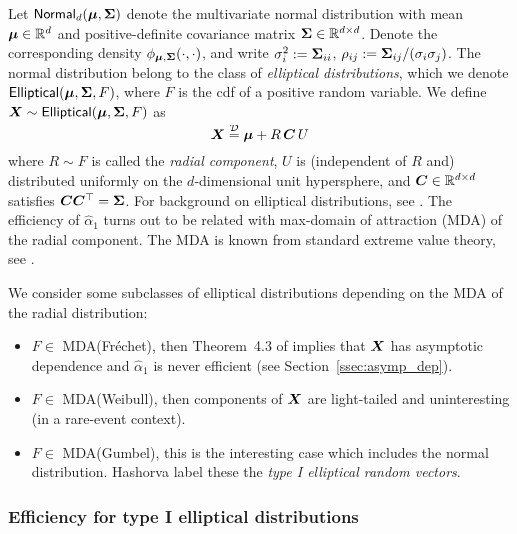 Let $\mathsf{Normal}_d(\bm{\mu},\bm{\Sigma})$ denote the multivariate normal distribution with mean $\bm{\mu} \in \mathbb{R}^d$ and positive-definite covariance matrix $\bm{\Sigma} \in \mathbb{R}^{d \times d}$. Denote the corresponding density $\phi_{\bm{\mu}, \bm{\Sigma}}(\cdot,\cdot)$, and write $\sigma_i^2 := \bm{\Sigma}_{ii}$, $\rho_{ij} := \bm{\Sigma}_{ij}/(\sigma_i \sigma_j)$.
The normal distribution belong to the class of \emph{elliptical distributions},
which we denote $\mathsf{Elliptical}(\bm{\mu}, \bm{\Sigma}, F)$, where $F$ is the cdf of a positive random variable. We define $\bm{X} \sim \mathsf{Elliptical}(\bm{\mu}, \bm{\Sigma}, F)$ as
\begin{equation}\label{ellip_distr}
	\bm{X} \stackrel{\smash{\mathcal{D}}}{=} \bm{\mu} + R \, \bm{C} \, U
\end{equation}
where $R \sim F$ is called the \emph{radial component}, $U$ is (independent of $R$ and) distributed uniformly on the $d$-dimensional unit hypersphere, and $\bm{C} \in \mathbb{R}^{d \times d}$ satisfies $\bm{C} \bm{C}^\top = \bm{\Sigma}$.
For background on elliptical distributions, see \cite{anderson2003introduction}.
The efficiency of $\hat{\alpha}_1$ turns out to be related with
max-domain of attraction (MDA) of the radial
component. The MDA is known from standard extreme value theory, see \cite{de2007extreme}.

We consider some subclasses of elliptical distributions depending on the MDA
of the radial distribution:
\begin{itemize}
\item $F \in$ \textsf{MDA(Fr\'echet)}, then Theorem~4.3 of \cite{hult2002multivariate} implies that $\bm{X}$ has asymptotic dependence and $\hat{\alpha}_1$ is never efficient (see Section~\ref{ssec:asymp_dep}).
\item $F \in$ \textsf{MDA(Weibull)}, then components of $\bm{X}$ are light-tailed and uninteresting (in a rare-event context).
\item $F \in$ \textsf{MDA(Gumbel)}, this is the interesting case which includes the normal distribution. Hashorva \cite{hashorva2007asymptotic} label these the \emph{type I elliptical random vectors}.
\end{itemize}

\subsubsection{Efficiency for type I elliptical distributions} \label{scn:type_1}

